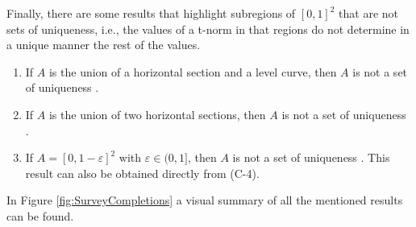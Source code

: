 Finally, there are some results that highlight subregions of $[0,1]^2$ that are not sets of uniqueness, i.e., the values of a t-norm in that regions do not determine in a unique manner the rest of the values.
\begin{enumerate}[label=(NSU-\arabic*)]
	\item If $A$ is the union of a horizontal section and a level curve, then $A$ is not a set of uniqueness \cite{Alsina2006}.
	\item If $A$ is the union of two horizontal sections, then $A$ is not a set of uniqueness \cite{Alsina2006}.
	\item If $A=[0,1-\varepsilon]^2$ with $\varepsilon\in(0,1]$, then $A$ is not a set of uniqueness \cite{Alsina2006}. This result can also be obtained directly from (C-4).
\end{enumerate}
In Figure \ref{fig:SurveyCompletions} a visual summary of all the mentioned results can be found.\\

